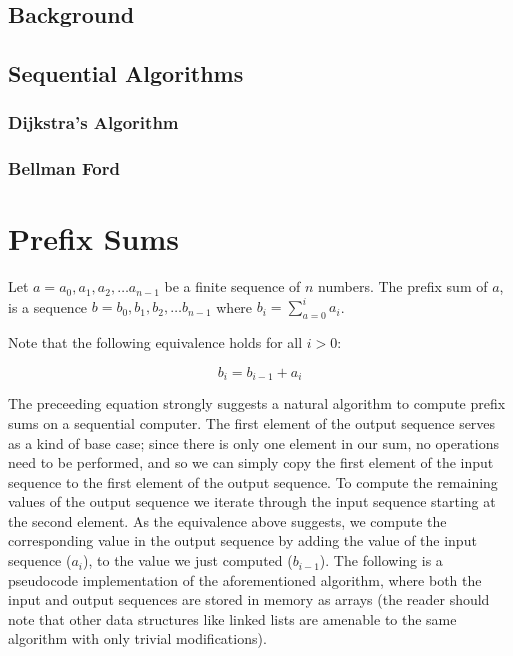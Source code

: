 \documentclass[12pt,twoside]{reedthesis}
\begin{document}
\section{Background}
\section{Sequential Algorithms}
\subsection{Dijkstra's Algorithm}
\subsection{Bellman Ford}


\chapter{Prefix Sums}
Let $a = a_0, a_1, a_2, \ldots a_{n-1}$ be a finite sequence of $n$
numbers.  The prefix sum of $a$, is a sequence $b = b_0, b_1, b_2,
\ldots b_{n-1}$ where $b_i = \sum_{a = 0}^i a_i$.



\vspace{1pc}

Note that the following equivalence holds for all $i > 0$:

$$
b_i = b_{i-1} + a_i
$$

The preceeding equation strongly suggests a natural algorithm to
compute prefix sums on a sequential computer. The first element of
the output sequence serves as a kind of base case; since there is
only one element in our sum, no operations need to be performed, and so we can simply copy the first element of the input sequence to the first element of the output sequence.  To compute the remaining values of the output sequence we iterate through the input sequence starting at the second element.  As the equivalence above suggests, we compute the corresponding value in the output sequence by adding the value of the input sequence ($a_i$), to the value we just computed ($b_{i-1}$). The following is a pseudocode implementation of the aforementioned algorithm, where both the input and output sequences are stored in memory as arrays (the reader should note that other data structures like linked lists are amenable to the same algorithm with only trivial modifications).
\end{document}
